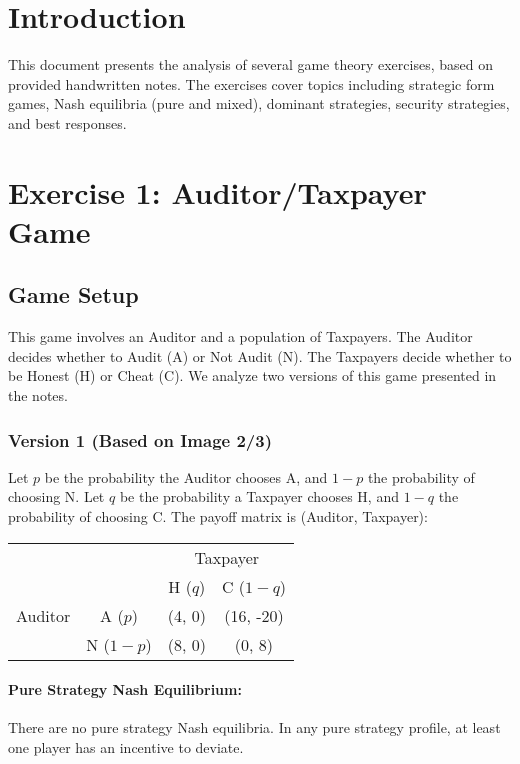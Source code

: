 \documentclass{article}
\begin{document}
\sloppy

\section{Introduction}
This document presents the analysis of several game theory exercises, based on provided handwritten notes. The exercises cover topics including strategic form games, Nash equilibria (pure and mixed), dominant strategies, security strategies, and best responses.

\section{Exercise 1: Auditor/Taxpayer Game}

\subsection{Game Setup}
This game involves an Auditor and a population of Taxpayers. The Auditor decides whether to Audit (A) or Not Audit (N). The Taxpayers decide whether to be Honest (H) or Cheat (C). We analyze two versions of this game presented in the notes.

\subsubsection{Version 1 (Based on Image 2/3)}
Let $p$ be the probability the Auditor chooses A, and $1-p$ the probability of choosing N.
Let $q$ be the probability a Taxpayer chooses H, and $1-q$ the probability of choosing C.
The payoff matrix is (Auditor, Taxpayer):
\begin{center}
\begin{tabular}{cc|c|c|}
  & \multicolumn{1}{c}{} & \multicolumn{2}{c}{Taxpayer} \\
  & \multicolumn{1}{c}{} & \multicolumn{1}{c}{H ($q$)} & \multicolumn{1}{c}{C ($1-q$)} \\ \cline{3-4}
  Auditor & A ($p$) & (4, 0) & (16, -20) \\ \cline{3-4}
  & N ($1-p$) & (8, 0) & (0, 8) \\ \cline{3-4}
\end{tabular}
\end{center}

\paragraph{Pure Strategy Nash Equilibrium:}
There are no pure strategy Nash equilibria. In any pure strategy profile, at least one player has an incentive to deviate.
\end{document}
